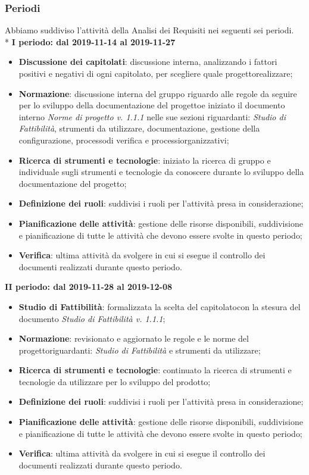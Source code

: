 \subsubsection{Periodi}
Abbiamo suddiviso l'attività della Analisi dei Requisiti nei seguenti sei periodi. \\*
\textbf{I periodo: dal 2019-11-14 al 2019-11-27}
\begin{itemize}
	\item \textbf{Discussione dei capitolati}\glo: discussione interna, analizzando i fattori positivi e negativi di ogni capitolato\glo, per scegliere quale progetto\glosp realizzare;
	\item \textbf{Normazione}: discussione interna del gruppo riguardo alle regole da seguire per lo sviluppo della documentazione del progetto\glosp e iniziato il documento interno \textit{Norme di progetto v. 1.1.1} nelle sue sezioni riguardanti: \textit{Studio di Fattibilità}, strumenti da utilizzare, documentazione, gestione della configurazione, processo\glosp di verifica e processi\glosp organizzativi;
	\item \textbf{Ricerca di strumenti e tecnologie}: iniziato la ricerca di gruppo e individuale sugli strumenti e tecnologie da conoscere durante lo sviluppo della documentazione del progetto\glo;
	\item \textbf{Definizione dei ruoli}: suddivisi i ruoli per l'attività presa in considerazione; 
	\item \textbf{Pianificazione delle attività}: gestione delle risorse disponibili, suddivisione e pianificazione di tutte le attività che devono essere svolte in questo periodo;
	\item \textbf{Verifica}: ultima attività da svolgere in cui si esegue il controllo dei documenti realizzati durante questo periodo.
\end{itemize}

\textbf{II periodo: dal 2019-11-28 al 2019-12-08}
\begin{itemize}
	\item \textbf{Studio di Fattibilità}: formalizzata la scelta del capitolato\glosp con la stesura del documento \textit{Studio di Fattibilità v. 1.1.1};
	\item \textbf{Normazione}: revisionato e aggiornato le regole e le norme del progetto\glosp riguardanti: \textit{Studio di Fattibilità} e strumenti da utilizzare;
	\item \textbf{Ricerca di strumenti e tecnologie}: continuato la ricerca di strumenti e tecnologie da utilizzare per lo sviluppo del prodotto\glo;
	\item \textbf{Definizione dei ruoli}: suddivisi i ruoli per l'attività presa in considerazione; 
	\item \textbf{Pianificazione delle attività}: gestione delle risorse disponibili, suddivisione e pianificazione di tutte le attività che devono essere svolte in questo periodo;
	\item \textbf{Verifica}: ultima attività da svolgere in cui si esegue il controllo dei documenti realizzati durante questo periodo.
\end{itemize}

